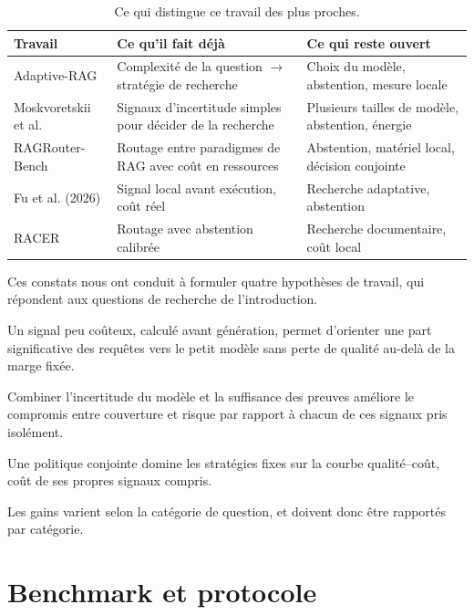 \documentclass[11pt,a4paper]{article}
\begin{document}
\begin{table}[H]
\centering\small
\begin{tabularx}{\textwidth}{l Y Y}
\toprule
\textbf{Travail} & \textbf{Ce qu'il fait déjà} & \textbf{Ce qui reste ouvert} \\
\midrule
Adaptive-RAG & Complexité de la question $\rightarrow$ stratégie de recherche & Choix du modèle, abstention, mesure locale \\
Moskvoretskii et al. & Signaux d'incertitude simples pour décider de la recherche & Plusieurs tailles de modèle, abstention, énergie \\
RAGRouter-Bench & Routage entre paradigmes de RAG avec coût en ressources & Abstention, matériel local, décision conjointe \\
Fu et al. (2026) & Signal local avant exécution, coût réel & Recherche adaptative, abstention \\
RACER & Routage avec abstention calibrée & Recherche documentaire, coût local \\
\bottomrule
\end{tabularx}
\caption{Ce qui distingue ce travail des plus proches.}
\label{tab:distinction}
\end{table}

Ces constats nous ont conduit à formuler quatre hypothèses de travail, qui répondent aux questions de
recherche de l'introduction.

\begin{description}[style=sameline,leftmargin=1cm]
\item[H1] Un signal peu coûteux, calculé avant génération, permet d'orienter une part significative
des requêtes vers le petit modèle sans perte de qualité au-delà de la marge fixée.
\item[H2] Combiner l'incertitude du modèle et la suffisance des preuves améliore le compromis entre
couverture et risque par rapport à chacun de ces signaux pris isolément.
\item[H3] Une politique conjointe domine les stratégies fixes sur la courbe qualité--coût, coût de ses
propres signaux compris.
\item[H4] Les gains varient selon la catégorie de question, et doivent donc être rapportés par
catégorie.
\end{description}

\section{Benchmark et protocole}\label{sec:protocole}
\end{document}
